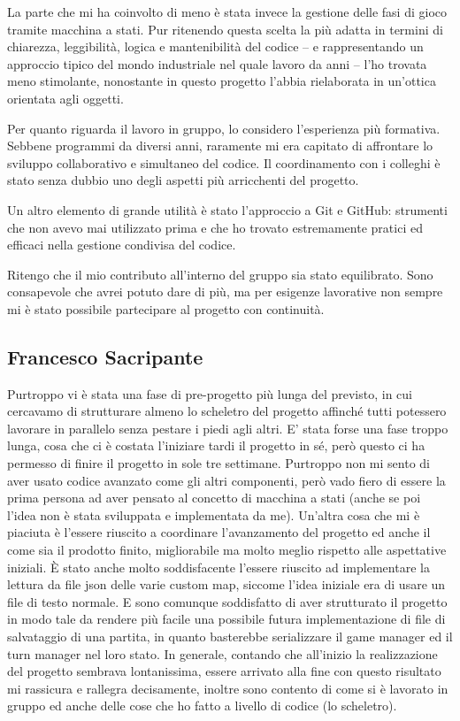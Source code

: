 \documentclass[a4paper,12pt]{report}
\begin{document}
La parte che mi ha coinvolto di meno è stata invece la gestione delle fasi di gioco tramite macchina a stati.
Pur ritenendo questa scelta la più adatta in termini di chiarezza, leggibilità, logica e mantenibilità del codice
-- e rappresentando un approccio tipico del mondo industriale nel quale lavoro da anni --
l'ho trovata meno stimolante, nonostante in questo progetto l'abbia rielaborata in un'ottica orientata agli oggetti.

Per quanto riguarda il lavoro in gruppo, lo considero l'esperienza più formativa.
Sebbene programmi da diversi anni, raramente mi era capitato di affrontare lo sviluppo collaborativo e simultaneo del codice.
Il coordinamento con i colleghi è stato senza dubbio uno degli aspetti più arricchenti del progetto.

Un altro elemento di grande utilità è stato l'approccio a Git e GitHub: strumenti che non avevo mai utilizzato prima e che ho trovato estremamente pratici ed efficaci nella gestione condivisa del codice.

Ritengo che il mio contributo all'interno del gruppo sia stato equilibrato. Sono consapevole che avrei potuto dare di più,
ma per esigenze lavorative non sempre mi è stato possibile partecipare al progetto con continuità.

\subsection{Francesco Sacripante}
Purtroppo vi è stata una fase di pre-progetto più lunga del previsto, in cui cercavamo di strutturare almeno lo scheletro del progetto affinché tutti potessero lavorare in parallelo senza pestare i piedi agli altri.
E' stata forse una fase troppo lunga, cosa che ci è costata l'iniziare tardi il progetto in sé, però questo ci ha permesso di finire il progetto in sole tre settimane.
Purtroppo non mi sento di aver usato codice avanzato come gli altri componenti, però vado fiero di essere la prima persona ad aver pensato al concetto di macchina a stati (anche se poi l'idea non è stata sviluppata e implementata da me).
Un'altra cosa che mi è piaciuta è l'essere riuscito a coordinare l'avanzamento del progetto ed anche il come sia il prodotto finito, migliorabile ma molto meglio rispetto alle aspettative iniziali.
È stato anche molto soddisfacente l'essere riuscito ad implementare la lettura da file json delle varie custom map, siccome l'idea iniziale era di usare un file di testo normale.
E sono comunque soddisfatto di aver strutturato il progetto in modo tale da rendere più facile una possibile futura implementazione di file di salvataggio di una partita, in quanto basterebbe serializzare il game manager ed il turn manager nel loro stato.
In generale, contando che all'inizio la realizzazione del progetto sembrava lontanissima, essere arrivato alla fine con questo risultato mi rassicura e rallegra decisamente, inoltre sono contento di come si è lavorato in gruppo ed anche delle cose che ho fatto a livello di codice (lo scheletro).
\end{document}

